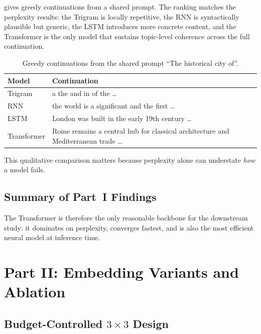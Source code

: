 \documentclass[10pt,a4paper]{article}
\begin{document}
 gives greedy continuations from a shared prompt. The ranking matches the perplexity results: the Trigram is locally repetitive, the RNN is syntactically plausible but generic, the LSTM introduces more concrete content, and the Transformer is the only model that sustains topic-level coherence across the full continuation.

\begin{table}[htbp]
\centering
\caption{Greedy continuations from the shared prompt ``The historical city of''.}
\label{tab:qualitative_samples}
\scriptsize
\renewcommand{\arraystretch}{1.03}
\begin{tabularx}{\linewidth}{@{}lX@{}}
\toprule
\textbf{Model} & \textbf{Continuation} \\
\midrule
Trigram & a the and in of the \ldots \\
RNN & the world is a significant and the first \ldots \\
LSTM & London was built in the early 19th century \ldots \\
Transformer & Rome remains a central hub for classical architecture and Mediterranean trade \ldots \\
\bottomrule
\end{tabularx}
\end{table}

This qualitative comparison matters because perplexity alone can understate \emph{how} a model fails.

\subsection{Summary of Part~I Findings}
\label{sec:part1_summary}

The Transformer is therefore the only reasonable backbone for the downstream study: it dominates on perplexity, converges fastest, and is also the most efficient neural model at inference time.

\FloatBarrier


\section{Part II: Embedding Variants and Ablation}
\label{sec:part2}

\subsection{Budget-Controlled $3 \times 3$ Design}
\label{sec:part2_scope}
\end{document}
